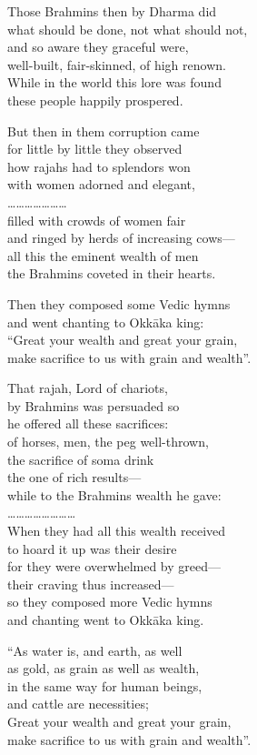 Those Brahmins then by Dharma did\\ what should be done, not what should not,\\ and so aware they graceful were,\\ well-built, fair-skinned, of high renown.\\ While in the world this lore was found\\ these people happily prospered.

But then in them corruption came\\ for little by little they observed\\ how rajahs had to splendors won\\ with women adorned and elegant,\\ …………………\\ filled with crowds of women fair\\ and ringed by herds of increasing cows—\\ all this the eminent wealth of men\\ the Brahmins coveted in their hearts.

Then they composed some Vedic hymns\\ and went chanting to Okkāka king:\\ “Great your wealth and great your grain,\\ make sacrifice to us with grain and wealth”.

That rajah, Lord of chariots,\\ by Brahmins was persuaded so\\ he offered all these sacrifices:\\ of horses, men, the peg well-thrown,\\ the sacrifice of soma drink\\ the one of rich results—\\ while to the Brahmins wealth he gave:\\ ……………………\\ When they had all this wealth received\\ to hoard it up was their desire\\ for they were overwhelmed by greed—\\ their craving thus increased—\\ so they composed more Vedic hymns\\ and chanting went to Okkāka king.

“As water is, and earth, as well\\ as gold, as grain as well as wealth,\\ in the same way for human beings,\\ and cattle are necessities;\\ Great your wealth and great your grain,\\ make sacrifice to us with grain and wealth”.

